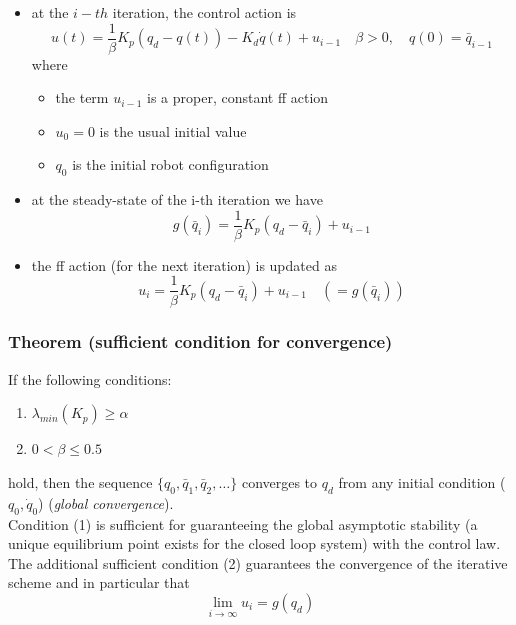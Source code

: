 \documentclass{book}
\begin{document}
\begin{itemize}
    \item at the $i-th$ iteration, the control action is \[
            u(t) =\displaystyle\frac{1}{\beta}K_p(q_d-q(t))-K_d\dot{q}(t)+u_{i-1} \quad \beta>0,\quad q(0)=\bar{q}_{i-1}
            \] where \begin{itemize}
            \item the term $u_{i-1}$ is a proper, constant ff action 
            \item $u_0=0$ is the usual initial value 
            \item $q_0$ is the initial robot configuration
        \end{itemize}
    \item at the steady-state of the i-th iteration we have 
        \[
            g(\bar{q}_i) = \displaystyle\frac{1}{\beta} K_p(q_d-\bar{q}_i)+u_{i-1}
        \]
        \item the ff action (for the next iteration) is updated as 
            \[
                u_i = \displaystyle\frac{1}{\beta}K_p(q_d-\bar{q}_i)+u_{i-1} \quad (=g(\bar{q}_i))
            \]
\end{itemize}
\subsubsection{Theorem (sufficient condition for convergence)}
If the following conditions:
\begin{enumerate}
    \item $\lambda_{min}(K_p)\geq \alpha$
    \item  $0<\beta\leq 0.5$
\end{enumerate}
hold, then the sequence $\{q_0,\bar{q}_1,\bar{q}_2,\dots\}$ converges to $q_d$ from any initial condition ($q_0,\dot{q}_0$) (\emph{global convergence}).\\
Condition (1) is sufficient for guaranteeing the global asymptotic stability (a unique equilibrium point exists for the closed loop system) with the control law. The additional sufficient condition (2) guarantees the convergence of the iterative scheme and in particular that 
\[
    \lim_{i\to\infty} u_i = g(q_d)
\]
\end{document}
